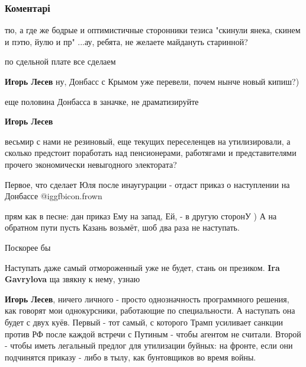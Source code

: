 
 
 
 
 
\subsubsection{Коментарі}
\label{sec:24_07_2018.fb.lesev_igor.1.chto_posle_juli.cmt}

\begin{itemize} %

тю, а где же бодрые и оптимистичные сторонники тезиса "скинули янека, скинем и
пэтю, йулю и пр" ...ау, ребята, не желаете майдануть старинной?

\begin{itemize} %
по сдельной плате все сделаем

\textbf{Игорь Лесев} ну, Донбасс с Крымом уже перевели, почем нынче новый кипиш?)

еще половина Донбасса в заначке, не драматизируйте

\textbf{Игорь Лесев} 

весьмир с нами не резиновый, еще текущих переселенцев на утилизировали, а сколько
предстоит поработать над пенсионерами, работягами и представителями прочего
экономически невыгодного электората?

\end{itemize} %

Первое, что сделает Юля после инаугурации - отдаст приказ о наступлении на Донбассе  @igg{fbicon.frown} 

\begin{itemize} %
прям как в песне: дан приказ Ему на запад, Ей, - в другую сторонУ )
А на обратном пути пусть Казань возьмёт, шоб два раза не наступать.

Поскорее бы

Наступать даже самый отмороженный уже не будет, стань он презиком.
\textbf{Ira Gavrylova} ща звякну к нему, узнаю

\textbf{Игорь Лесев}, ничего личного - просто однозначность программного решения, как говорят мои однокурсники, работающие по специальности.
А наступать она будет с двух куёв. Первый - тот самый, с которого Трамп усиливает санкции против РФ после каждой встречи с Путиным - чтобы агентом не считали. Второй - чтобы иметь легальный предлог для утилизации буйных: на фронте, если они подчинятся приказу - либо в тылу, как бунтовщиков во время войны.


\end{itemize}
\end{itemize}
